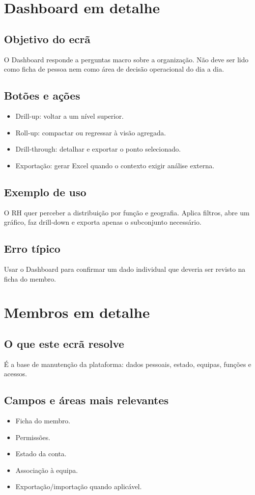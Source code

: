 \section{Dashboard em detalhe}
\subsection{Objetivo do ecrã}
O Dashboard responde a perguntas macro sobre a organização. Não deve ser lido como ficha de pessoa nem como área de decisão operacional do dia a dia.

\subsection{Botões e ações}
\begin{itemize}
  \item Drill-up: voltar a um nível superior.
  \item Roll-up: compactar ou regressar à visão agregada.
  \item Drill-through: detalhar e exportar o ponto selecionado.
  \item Exportação: gerar Excel quando o contexto exigir análise externa.
\end{itemize}

\subsection{Exemplo de uso}
O RH quer perceber a distribuição por função e geografia. Aplica filtros, abre um gráfico, faz drill-down e exporta apenas o subconjunto necessário.

\subsection{Erro típico}
Usar o Dashboard para confirmar um dado individual que deveria ser revisto na ficha do membro.

\section{Membros em detalhe}
\subsection{O que este ecrã resolve}
É a base de manutenção da plataforma: dados pessoais, estado, equipas, funções e acessos.

\subsection{Campos e áreas mais relevantes}
\begin{itemize}
  \item Ficha do membro.
  \item Permissões.
  \item Estado da conta.
  \item Associação à equipa.
  \item Exportação/importação quando aplicável.
\end{itemize}

